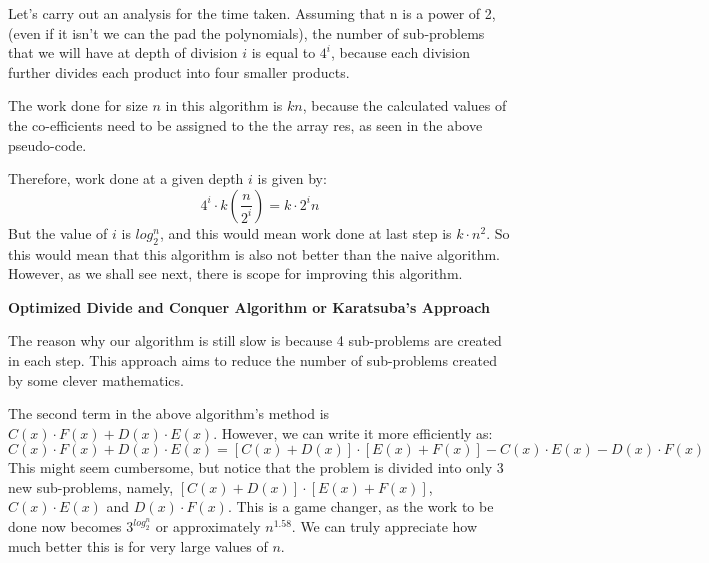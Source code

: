 \documentclass{article}
\theoremstyle{definition}
\theoremstyle{example}
\begin{document}
Let's carry out an analysis for the time taken. Assuming that n is a power of 2, (even if it isn't we can the pad the polynomials), the number of sub-problems that we will have at depth of division $i$ is equal to $4^i$, because each division further divides each product into four smaller products.\par
\vspace{4mm}
The work done for size $n$ in this algorithm is $kn$, because the calculated values of the co-efficients need to be assigned to the the array res, as seen in the above pseudo-code.\par
\vspace{4mm}
Therefore, work done at a given depth $i$ is given by: \[4^i\cdot k(\frac{n}{2^i}) = k\cdot 2^in\] 
But the value of $i$ is $log_2^n$, and this would mean work done at last step is \(k\cdot n^2\). So this would mean that this algorithm is also not better than the naive algorithm. However, as we shall see next, there is scope for improving this algorithm.\par
\vspace{4mm}
\newpage
\noindent \textbf{Optimized Divide and Conquer Algorithm or Karatsuba's Approach} \par
\vspace{4mm}
The reason why our algorithm is still slow is because 4 sub-problems are created in each step. This approach aims to reduce the number of sub-problems created by some clever mathematics.\par
\vspace{4mm}
The second term in the above algorithm's method is  $C(x)\cdot F(x) + D(x)\cdot E(x)$. However, we can write it more efficiently as: \[C(x)\cdot F(x) + D(x)\cdot E(x) = [C(x) + D(x)]\cdot [E(x) + F(x)] - C(x)\cdot E(x) - D(x)\cdot F(x)\]
This might seem cumbersome, but notice that the problem is divided into only 3 new sub-problems, namely, $[C(x) + D(x)]\cdot [E(x) + F(x)]$, $C(x)\cdot E(x)$ and $D(x)\cdot F(x)$. This is a game changer, as the work to be done now becomes $3^{log_2^n}$ or approximately $n^{1.58}$. We can truly appreciate how much better this is for very large values of $n$.
\end{document}
